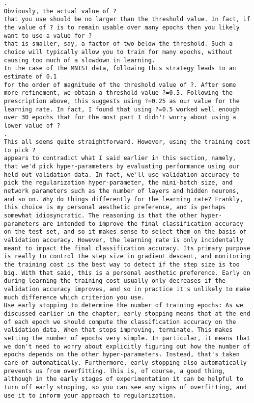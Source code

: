 \begin{lstlisting}
.
Obviously, the actual value of ?
that you use should be no larger than the threshold value. In fact, if the value of ? is to remain usable over many epochs then you likely want to use a value for ?
that is smaller, say, a factor of two below the threshold. Such a choice will typically allow you to train for many epochs, without causing too much of a slowdown in learning.
In the case of the MNIST data, following this strategy leads to an estimate of 0.1
for the order of magnitude of the threshold value of ?. After some more refinement, we obtain a threshold value ?=0.5. Following the prescription above, this suggests using ?=0.25 as our value for the learning rate. In fact, I found that using ?=0.5 worked well enough over 30 epochs that for the most part I didn't worry about using a lower value of ?
.
This all seems quite straightforward. However, using the training cost to pick ?
appears to contradict what I said earlier in this section, namely, that we'd pick hyper-parameters by evaluating performance using our held-out validation data. In fact, we'll use validation accuracy to pick the regularization hyper-parameter, the mini-batch size, and network parameters such as the number of layers and hidden neurons, and so on. Why do things differently for the learning rate? Frankly, this choice is my personal aesthetic preference, and is perhaps somewhat idiosyncratic. The reasoning is that the other hyper-parameters are intended to improve the final classification accuracy on the test set, and so it makes sense to select them on the basis of validation accuracy. However, the learning rate is only incidentally meant to impact the final classification accuracy. Its primary purpose is really to control the step size in gradient descent, and monitoring the training cost is the best way to detect if the step size is too big. With that said, this is a personal aesthetic preference. Early on during learning the training cost usually only decreases if the validation accuracy improves, and so in practice it's unlikely to make much difference which criterion you use.
Use early stopping to determine the number of training epochs: As we discussed earlier in the chapter, early stopping means that at the end of each epoch we should compute the classification accuracy on the validation data. When that stops improving, terminate. This makes setting the number of epochs very simple. In particular, it means that we don't need to worry about explicitly figuring out how the number of epochs depends on the other hyper-parameters. Instead, that's taken care of automatically. Furthermore, early stopping also automatically prevents us from overfitting. This is, of course, a good thing, although in the early stages of experimentation it can be helpful to turn off early stopping, so you can see any signs of overfitting, and use it to inform your approach to regularization.

\end{lstlisting}

